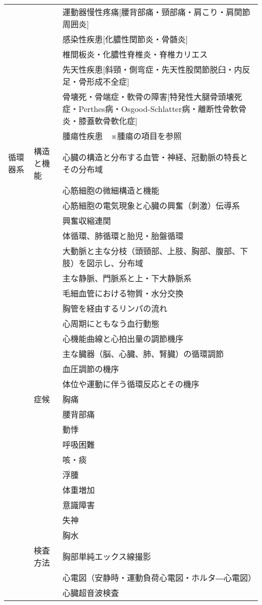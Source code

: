 \begin{xltabular}{\linewidth}{XXX}
 &  & 運動器慢性疼痛[腰背部痛・頸部痛・肩こり・肩関節周囲炎] \\
 &  & 感染性疾患[化膿性関節炎・骨髄炎] \\
 &  & 椎間板炎・化膿性脊椎炎・脊椎カリエス \\
 &  & 先天性疾患[斜頸・側弯症・先天性股関節脱臼・内反足・骨形成不全症] \\
 &  & 骨壊死・骨端症・軟骨の障害[特発性大腿骨頭壊死症・Perthes病・Osgood-Schlatter病・離断性骨軟骨炎・膝蓋軟骨軟化症] \\
 &  & 腫瘍性疾患　※腫瘍の項目を参照 \\
循環器系 & 構造と機能 & 心臓の構造と分布する血管・神経、冠動脈の特長とその分布域 \\
 &  & 心筋細胞の微細構造と機能 \\
 &  & 心筋細胞の電気現象と心臓の興奮（刺激）伝導系 \\
 &  & 興奮収縮連関 \\
 &  & 体循環、肺循環と胎児・胎盤循環 \\
 &  & 大動脈と主な分枝（頭頸部、上肢、胸部、腹部、下肢）を図示し、分布域 \\
 &  & 主な静脈、門脈系と上・下大静脈系 \\
 &  & 毛細血管における物質・水分交換 \\
 &  & 胸管を経由するリンパの流れ \\
 &  & 心周期にともなう血行動態 \\
 &  & 心機能曲線と心拍出量の調節機序 \\
 &  & 主な臓器（脳、心臓、肺、腎臓）の循環調節 \\
 &  & 血圧調節の機序 \\
 &  & 体位や運動に伴う循環反応とその機序 \\
 & 症候 & 胸痛 \\
 &  & 腰背部痛 \\
 &  & 動悸 \\
 &  & 呼吸困難 \\
 &  & 咳・痰 \\
 &  & 浮腫 \\
 &  & 体重増加 \\
 &  & 意識障害 \\
 &  & 失神 \\
 &  & 胸水 \\
 & 検査方法 & 胸部単純エックス線撮影 \\
 &  & 心電図（安静時・運動負荷心電図・ホルタ―心電図） \\
 &  & 心臓超音波検査 \\

\end{xltabular}
